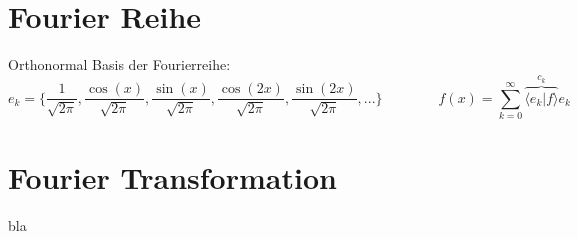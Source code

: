 \section{Fourier Reihe}

Orthonormal Basis der Fourierreihe:
\[  
	e_k=\{\frac{1}{\sqrt{2 \pi}}, \frac{\cos(x)}{\sqrt{2 \pi}}, \frac{\sin(x)}{\sqrt{2 \pi}}, \frac{\cos(2x)}{\sqrt{2 \pi}}, \frac{\sin(2x)}{\sqrt{2 \pi}}, ... \} 
	\qquad \qquad
	f(x) = \sum_{k=0}^{\infty}\overbrace{\langle e_k|f \rangle}^{c_k} e_k
\]

\section{Fourier Transformation}

bla
